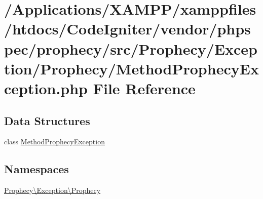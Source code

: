 \hypertarget{_method_prophecy_exception_8php}{}\section{/\+Applications/\+X\+A\+M\+P\+P/xamppfiles/htdocs/\+Code\+Igniter/vendor/phpspec/prophecy/src/\+Prophecy/\+Exception/\+Prophecy/\+Method\+Prophecy\+Exception.php File Reference}
\label{_method_prophecy_exception_8php}
\subsection*{Data Structures}
\begin{DoxyCompactItemize}
\item 
class \mbox{\hyperlink{class_prophecy_1_1_exception_1_1_prophecy_1_1_method_prophecy_exception}{Method\+Prophecy\+Exception}}
\end{DoxyCompactItemize}
\subsection*{Namespaces}
\begin{DoxyCompactItemize}
\item 
 \mbox{\hyperlink{namespace_prophecy_1_1_exception_1_1_prophecy}{Prophecy\textbackslash{}\+Exception\textbackslash{}\+Prophecy}}
\end{DoxyCompactItemize}
